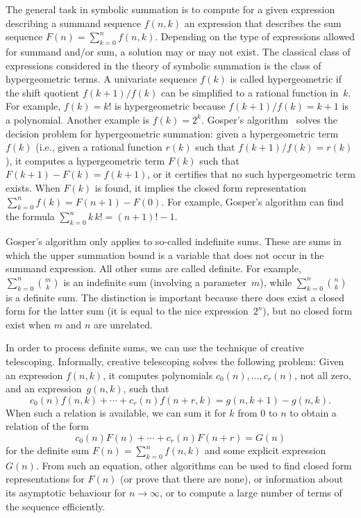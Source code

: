 \documentclass[a4paper,draft]{amsart}
\begin{document}
 The general task in symbolic summation is to compute for a given expression describing
 a summand sequence $f(n,k)$ an expression that describes the sum sequence $F(n)=\sum_{k=0}^n f(n,k)$.
 Depending on the type of expressions allowed for summand and/or sum, a solution may or may
 not exist. The classical class of expressions considered in the theory of symbolic summation
 is the class of hypergeometric terms. A univariate sequence $f(k)$ is called hypergeometric if the
 shift quotient $f(k+1)/f(k)$ can be simplified to a rational function in~$k$. For example,
 $f(k)=k!$ is hypergeometric because $f(k+1)/f(k)=k+1$ is a polynomial.
 Another example is $f(k)=2^k$.
 Gosper's algorithm~\cite{gosper78} solves the decision problem for hypergeometric summation:
 given a hypergeometric term $f(k)$ (i.e., given a rational function $r(k)$ such that
 $f(k+1)/f(k)=r(k)$), it computes a hypergeometric term $F(k)$ such that $F(k+1)-F(k)=f(k+1)$,
 or it certifies that no such hypergeometric term exists.
 When $F(k)$ is found, it implies the closed form representation $\sum_{k=0}^n f(k)=F(n+1)-F(0)$.
 For example, Gosper's algorithm can find the formula $\sum_{k=0}^n k\,k!=(n+1)!-1$.

 Gosper's algorithm only applies to so-called indefinite sums. These are sums in which the upper
 summation bound is a variable that does not occur in the summand expression. All other sums
 are called definite. For example,
 $\sum_{k=0}^n \binom mk$ is an indefinite sum (involving a parameter~$m$), while
 $\sum_{k=0}^n \binom nk$ is a definite sum.
 The distinction is important because there does exist a closed form for the latter sum
 (it is equal to the nice expression~$2^n$), but no closed form exist when $m$ and $n$ are
 unrelated.

 In order to process definite sums, we can use the technique of creative telescoping.
 Informally, creative telescoping solves the following problem:
 Given an expression $f(n,k)$, it computes polynomials $c_0(n),\dots,c_r(n)$, not all zero,
 and an expression~$g(n,k)$, such that
 \[
   c_0(n)f(n,k) + \cdots + c_r(n)f(n+r,k) = g(n,k+1) - g(n,k).
 \]
 When such a relation is available, we can sum it for $k$ from $0$ to $n$ to obtain a relation of the form
 \[
   c_0(n) F(n) + \cdots + c_r(n) F(n+r) = G(n)
 \]
 for the definite sum $F(n)=\sum_{k=0}^n f(n,k)$ and some explicit expression~$G(n)$.
 From such an equation, other algorithms can be used to find closed form representations for $F(n)$ (or
 prove that there are none), or information about its asymptotic behaviour for $n\to\infty$, or
 to compute a large number of terms of the sequence efficiently.
\end{document}
